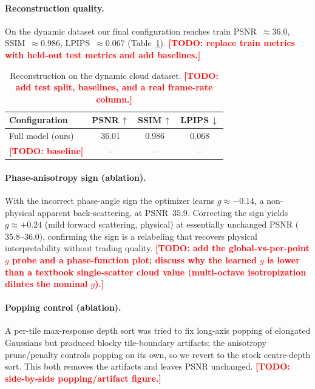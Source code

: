 \documentclass[sigconf]{acmart}
\newcommand{\todo}[1]{\textcolor{red}{\textbf{[TODO: #1]}}}
\begin{document}
\paragraph{Reconstruction quality.}
On the dynamic dataset our final configuration reaches train
PSNR~$\approx 36.0$, SSIM~$\approx 0.986$, LPIPS~$\approx 0.067$
(Table~\ref{tab:main}). \todo{replace train metrics with held-out test metrics
and add baselines.}

\begin{table}[t]
  \caption{Reconstruction on the dynamic cloud dataset. \todo{add test split,
  baselines, and a real frame-rate column.}}
  \label{tab:main}
  \begin{tabular}{lccc}
    \toprule
    Configuration & PSNR\,$\uparrow$ & SSIM\,$\uparrow$ & LPIPS\,$\downarrow$\\
    \midrule
    Full model (ours) & 36.01 & 0.986 & 0.068 \\
    \todo{baseline}    & --    & --    & --    \\
    \bottomrule
  \end{tabular}
\end{table}

\paragraph{Phase-anisotropy sign (ablation).}
With the incorrect phase-angle sign the optimizer learns $g \approx -0.14$, a
non-physical apparent back-scattering, at PSNR~$35.9$. Correcting the sign
yields $g \approx +0.24$ (mild forward scattering, physical) at essentially
unchanged PSNR ($35.8$--$36.0$), confirming the sign is a relabeling that
recovers physical interpretability without trading quality. \todo{add the
global-vs-per-point $g$ probe and a phase-function plot; discuss why the learned
$g$ is lower than a textbook single-scatter cloud value (multi-octave
isotropization dilutes the nominal $g$).}

\paragraph{Popping control (ablation).}
A per-tile max-response depth sort was tried to fix long-axis popping of
elongated Gaussians but produced blocky tile-boundary artifacts; the anisotropy
prune/penalty controls popping on its own, so we revert to the stock
centre-depth sort. This both removes the artifacts and leaves PSNR unchanged.
\todo{side-by-side popping/artifact figure.}
\end{document}
